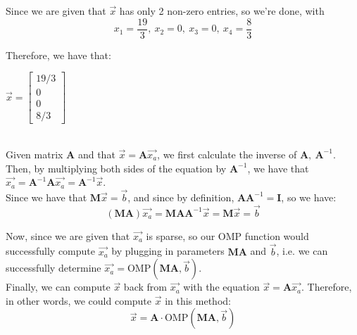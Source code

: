 \documentclass{article}
\begin{document}
Since we are given that $\vec{x}$ has only 2 non-zero entries, so we're done, with
{\color{red}
$$x_1 = \frac{19}{3},\
x_2 = 0,\
x_3 = 0,\
x_4 = \frac{8}{3}$$}

Therefore, we have that:
{\color{red}
\begin{center}
	$\vec{x} =
	\begin{bmatrix}
		19/3 \\
		0 \\
		0 \\
		8/3
	\end{bmatrix}$
\end{center} }

 \\

Given matrix $\mathbf{A}$ and that $\vec{x} = \mathbf{A}\vec{x_a}$, we first calculate the inverse of $\mathbf{A},\ \mathbf{A}^{-1}$.
Then, by multiplying both sides of the equation by $\mathbf{A}^{-1}$, we have that $\vec{x_a} = \mathbf{A}^{-1}\mathbf{A}\vec{x_a} = \mathbf{A}^{-1}\vec{x}$. \\

Since we have that $\mathbf{M}\vec{x} = \vec{b}$, and since by definition, $\mathbf{A}\mathbf{A}^{-1} = \mathbf{I}$, so we have:
$$(\mathbf{M}\mathbf{A})\vec{x_a} =
\mathbf{M}\mathbf{A}\mathbf{A}^{-1}\vec{x} =
\mathbf{M}\vec{x} = \vec{b}$$

Now, since we are given that $\vec{x_a}$ is sparse, so our OMP function would successfully compute $\vec{x_a}$ by plugging in parameters $\mathbf{M}\mathbf{A}$ and $\vec{b}$, i.e. we can successfully determine
$\vec{x_a} = \text{OMP}(\mathbf{M}\mathbf{A}, \vec{b})$. \\

Finally, we can compute $\vec{x}$ back from $\vec{x_a}$ with the equation $\vec{x} = \mathbf{A}\vec{x_a}$. Therefore, in other words, we could compute $\vec{x}$ in this method:
$$\vec{x} = \mathbf{A}\cdot\text{OMP}(\mathbf{M}\mathbf{A}, \vec{b})$$
\end{document}
